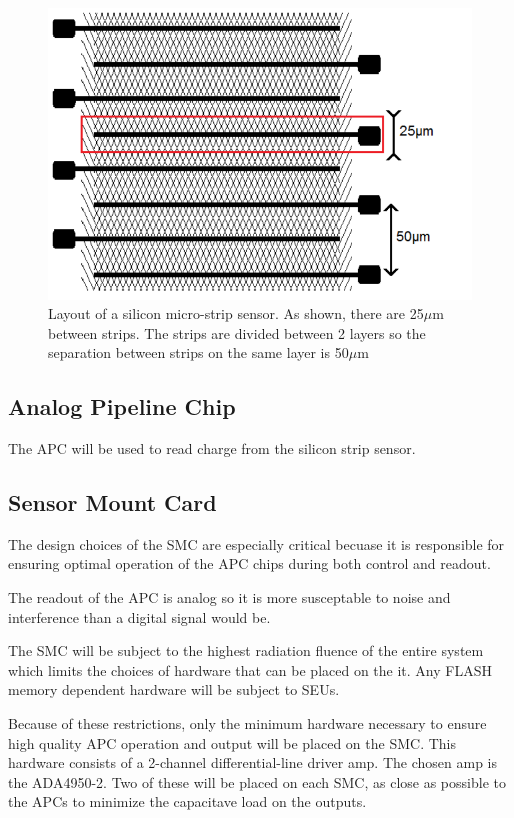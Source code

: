 \documentclass{article}
\begin{document}
\begin{figure}[h]
  \centering
  \includegraphics{./figures/Microstrip_Sensor.png}
  \caption{Layout of a silicon micro-strip sensor. As shown, there are 25$\mu$m between strips. The strips are divided between 2 layers so the separation between strips on the same layer is 50$\mu$m}
  \label{fig:Microstrip_Sensor}
\end{figure}

\subsection{Analog Pipeline Chip}
The \gls{APC} will be used to read charge from the silicon strip sensor.

\subsection{Sensor Mount Card}
\label{sec:HardProp:SMC}

The design choices of the \gls{SMC} are especially critical becuase it is responsible for ensuring optimal operation of the \gls{APC} chips during both control and readout.

The readout of the \gls{APC} is analog so it is more susceptable to noise and interference than a digital signal would be.

The SMC will be subject to the highest radiation fluence of the entire system which limits the choices of hardware that can be placed on the it. Any FLASH memory dependent hardware will be subject to \gls{SEU}s.

Because of these restrictions, only the minimum hardware necessary to ensure high quality \gls{APC} operation and output will be placed on the SMC. This hardware consists of a 2-channel differential-line driver amp. The chosen amp is the ADA4950-2\cite{ADA4950}. Two of these will be placed on each SMC, as close as possible to the \gls{APC}s to minimize the capacitave load on the outputs.
\end{document}
